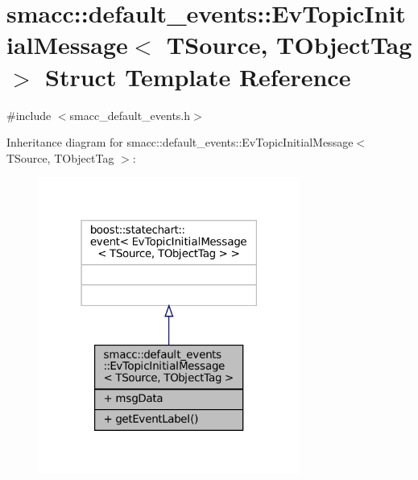 \hypertarget{structsmacc_1_1default__events_1_1EvTopicInitialMessage}{}\section{smacc\+:\+:default\+\_\+events\+:\+:Ev\+Topic\+Initial\+Message$<$ T\+Source, T\+Object\+Tag $>$ Struct Template Reference}
\label{structsmacc_1_1default__events_1_1EvTopicInitialMessage}


{\ttfamily \#include $<$smacc\+\_\+default\+\_\+events.\+h$>$}



Inheritance diagram for smacc\+:\+:default\+\_\+events\+:\+:Ev\+Topic\+Initial\+Message$<$ T\+Source, T\+Object\+Tag $>$\+:
\nopagebreak
\begin{figure}[H]
\begin{center}
\leavevmode
\includegraphics[width=243pt]{structsmacc_1_1default__events_1_1EvTopicInitialMessage__inherit__graph}
\end{center}
\end{figure}


